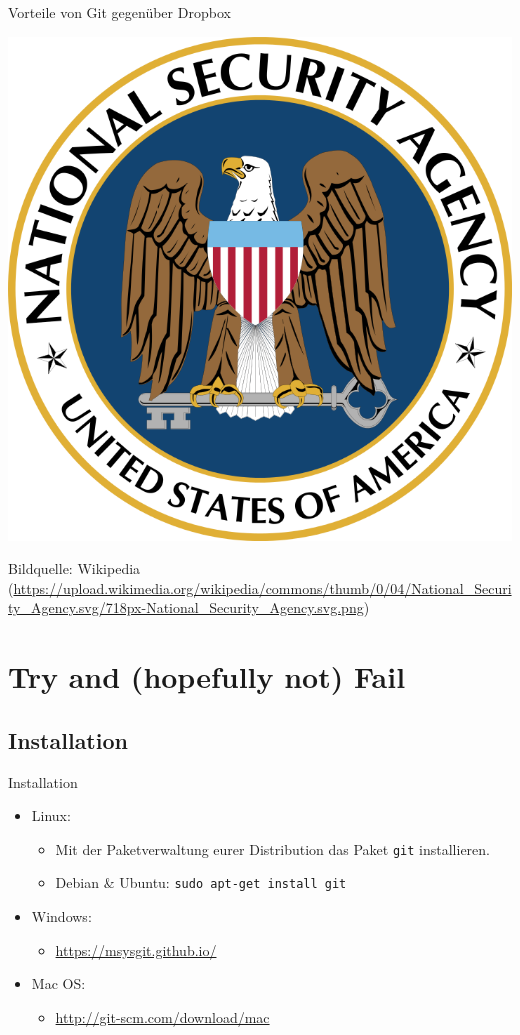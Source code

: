 \documentclass{beamer}
\begin{document}
\begin{frame}{Vorteile von Git gegenüber Dropbox}
	\begin{center}
		\includegraphics[height=0.7\textheight]{nsa.png}
	\end{center}
	{\scriptsize Bildquelle: Wikipedia (\url{https://upload.wikimedia.org/wikipedia/commons/thumb/0/04/National_Security_Agency.svg/718px-National_Security_Agency.svg.png})}
\end{frame}

\section{Try and (hopefully not) Fail}
\subsection{Installation}
\begin{frame}[fragile]{Installation}
	\begin{itemize}
		\item Linux:
			\begin{itemize}
				\item Mit der Paketverwaltung eurer Distribution das Paket \verb|git| installieren.
				\item Debian \& Ubuntu: \verb|sudo apt-get install git|
			\end{itemize}
		\item Windows:
			\begin{itemize}
				\item \url{https://msysgit.github.io/}
			\end{itemize}
		\item Mac OS:
			\begin{itemize}
				\item \url{http://git-scm.com/download/mac}
			\end{itemize}
	\end{itemize}
\end{frame}
\end{document}
